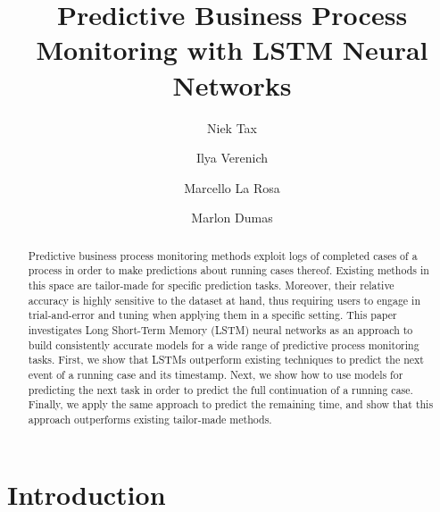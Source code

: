 \documentclass[runningheads,a4paper]{llncs}
\begin{document}
\mainmatter  

\title{Predictive Business Process Monitoring with LSTM Neural Networks }


\author{Niek Tax \and Ilya Verenich \and Marcello La Rosa \and Marlon Dumas}




\maketitle


\begin{abstract}
Predictive business process monitoring methods exploit logs of completed cases of a process in order to make predictions about running cases thereof.
Existing methods in this space are tailor-made for specific prediction tasks. Moreover, their relative accuracy is highly sensitive to the dataset at hand, thus requiring users to engage in trial-and-error and tuning when applying them in a specific setting. 
This paper investigates Long Short-Term Memory (LSTM) neural networks as an approach to build consistently accurate models for a wide range of predictive process monitoring tasks. 
First, we show that LSTMs outperform existing techniques to predict the next event of a running case and its timestamp. 
Next, we show how to use models for predicting the next task in order to predict the full continuation of a running case.
Finally, we apply the same approach to predict the remaining time, and show that this approach outperforms existing tailor-made methods. 




\end{abstract}


\section{Introduction}
\label{sec:introduction}
\end{document}
